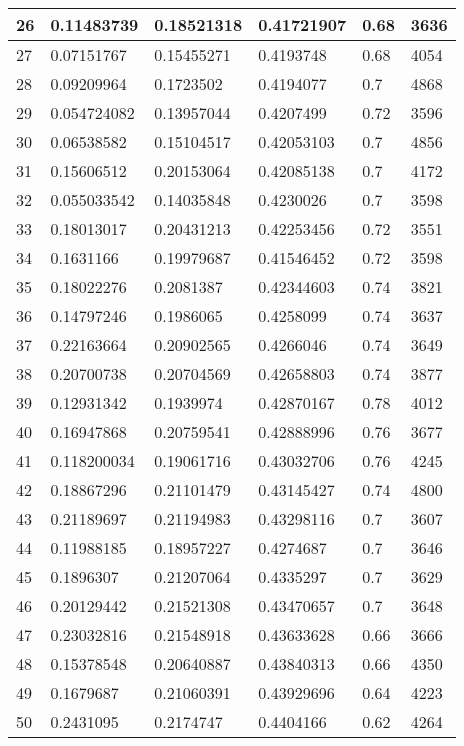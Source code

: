\begin{longtable}{|l|l|l|l|l|l|}
26 & 0.11483739 & 0.18521318 & 0.41721907 & 0.68 & 3636 \\ \hline 
27 & 0.07151767 & 0.15455271 & 0.4193748 & 0.68 & 4054 \\ \hline 
28 & 0.09209964 & 0.1723502 & 0.4194077 & 0.7 & 4868 \\ \hline 
29 & 0.054724082 & 0.13957044 & 0.4207499 & 0.72 & 3596 \\ \hline 
30 & 0.06538582 & 0.15104517 & 0.42053103 & 0.7 & 4856 \\ \hline 
31 & 0.15606512 & 0.20153064 & 0.42085138 & 0.7 & 4172 \\ \hline 
32 & 0.055033542 & 0.14035848 & 0.4230026 & 0.7 & 3598 \\ \hline 
33 & 0.18013017 & 0.20431213 & 0.42253456 & 0.72 & 3551 \\ \hline 
34 & 0.1631166 & 0.19979687 & 0.41546452 & 0.72 & 3598 \\ \hline 
35 & 0.18022276 & 0.2081387 & 0.42344603 & 0.74 & 3821 \\ \hline 
36 & 0.14797246 & 0.1986065 & 0.4258099 & 0.74 & 3637 \\ \hline 
37 & 0.22163664 & 0.20902565 & 0.4266046 & 0.74 & 3649 \\ \hline 
38 & 0.20700738 & 0.20704569 & 0.42658803 & 0.74 & 3877 \\ \hline 
39 & 0.12931342 & 0.1939974 & 0.42870167 & 0.78 & 4012 \\ \hline 
40 & 0.16947868 & 0.20759541 & 0.42888996 & 0.76 & 3677 \\ \hline 
41 & 0.118200034 & 0.19061716 & 0.43032706 & 0.76 & 4245 \\ \hline 
42 & 0.18867296 & 0.21101479 & 0.43145427 & 0.74 & 4800 \\ \hline 
43 & 0.21189697 & 0.21194983 & 0.43298116 & 0.7 & 3607 \\ \hline 
44 & 0.11988185 & 0.18957227 & 0.4274687 & 0.7 & 3646 \\ \hline 
45 & 0.1896307 & 0.21207064 & 0.4335297 & 0.7 & 3629 \\ \hline 
46 & 0.20129442 & 0.21521308 & 0.43470657 & 0.7 & 3648 \\ \hline 
47 & 0.23032816 & 0.21548918 & 0.43633628 & 0.66 & 3666 \\ \hline 
48 & 0.15378548 & 0.20640887 & 0.43840313 & 0.66 & 4350 \\ \hline 
49 & 0.1679687 & 0.21060391 & 0.43929696 & 0.64 & 4223 \\ \hline 
50 & 0.2431095 & 0.2174747 & 0.4404166 & 0.62 & 4264 \\ \hline 
\end{longtable}